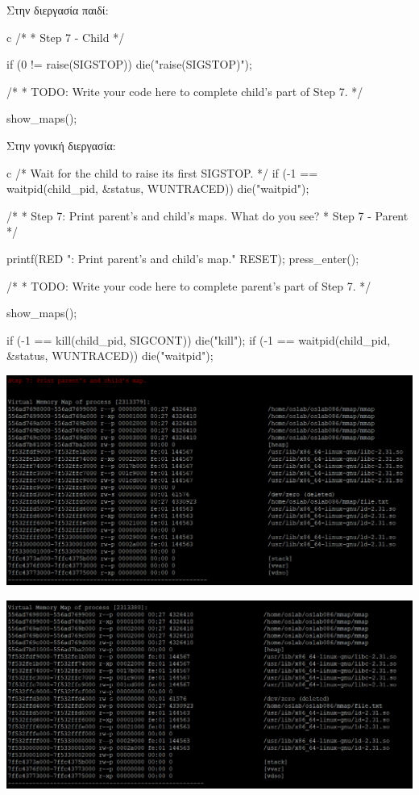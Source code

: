 \documentclass[12pt]{article}
\begin{document}
Στην διεργασία παιδί:

\begin{codeless}{c}
    /*
    * Step 7 - Child
    */
   
   if (0 != raise(SIGSTOP)) 
   {
       die("raise(SIGSTOP)");
   }
   
   /*
    * TODO: Write your code here to complete child's part of Step 7.
    */
   
   show_maps();
\end{codeless}

Στην γονική διεργασία:

\begin{codeless}{c}
    /* Wait for the child to raise its first SIGSTOP. */
	if (-1 == waitpid(child_pid, &status, WUNTRACED))
		die("waitpid");

	/*
	 * Step 7: Print parent's and child's maps. What do you see?
	 * Step 7 - Parent
	 */
	
	printf(RED ": Print parent's and child's map.\n" RESET);
	press_enter();

	/*
	 * TODO: Write your code here to complete parent's part of Step 7.
	 */
	
	show_maps();
	
	if (-1 == kill(child_pid, SIGCONT))
	{
		die("kill");
	}
	if (-1 == waitpid(child_pid, &status, WUNTRACED))
	{
		die("waitpid");
	}
\end{codeless}

\centerline{\includegraphics[width=1\textwidth]{3_1_7.png}}
\centerline{\includegraphics[width=1\textwidth]{3_1_7b.png}}
\end{document}
